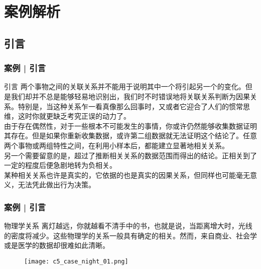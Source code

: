 \section{案例解析}
\subsection{引言}
\begin{frame}
  \frametitle{案例 | 引言}
  \begin{block}{引言}
两个事物之间的关联关系并不能用于说明其中一个将引起另一个的变化。但是我们却并不总是能够轻易地识别出，我们时不时错误地将关联关系判断为因果关系。特别是，当这种关系乍一看真像那么回事时，又或者它迎合了人们的惯常思维，这时你就更缺乏考究正误的动力了。\\
\vspace{0.5em}
由于存在偶然性，对于一些根本不可能发生的事情，你或许仍然能够收集数据证明其存在。但是如果你重新收集数据，或许第二组数据就无法证明这个结论了。\alert{任意两个事物或两组特性之间，在利用小样本后，都能建立显著地相关关系。}\\
\vspace{0.5em}
另一个需要留意的是，超过了推断相关关系的数据范围而得出的结论。正相关到了一定的程度后便急剧地转为负相关。\\
\vspace{0.5em}
某种相关关系也许是真实的，它依据的也是真实的因果关系，但同样也可能毫无意义，无法凭此做出行为决策。
  \end{block}
\end{frame}

\begin{frame}
  \frametitle{案例 | 引言}
  \begin{block}{物理学关系}
离灯越远，你就越看不清手中的书，也就是说，当距离增大时，光线的密度将减少。这些物理学的关系一般具有确定的相关。然而，来自商业、社会学或是医学的数据却很难如此清晰。
  \end{block}
  \vspace{-0.5em}
  \begin{figure}
    \centering
    \texttt{[image: c5\_case\_night\_01.png]}
  \end{figure}
\end{frame}

